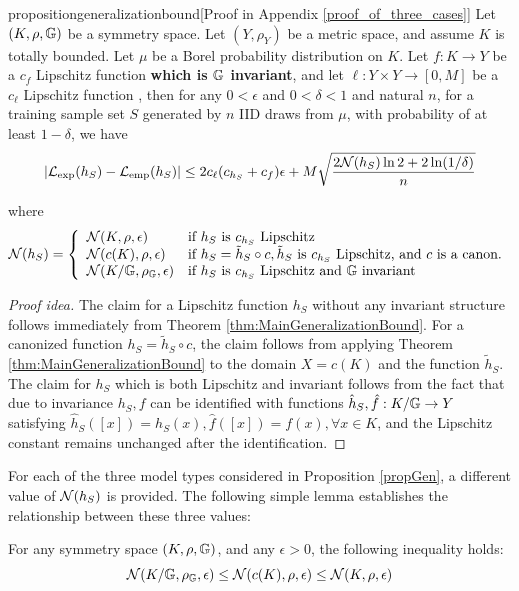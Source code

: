 \begin{restatable}{proposition}{generalizationbound}[Proof  in Appendix \ref{proof_of_three_cases}]
\label{propGen}
Let $(K,\rho,\mathbb{G})$ be a symmetry space. Let $(Y,\rho_Y) $ be a metric space, and assume $K$ is totally bounded. Let $\mu$ be a Borel probability distribution on $K$. Let $f:K\to Y $ be a $c_f$  Lipschitz function \textbf{which is $\mathbb{G} $ invariant}, and let $\ell:Y\times Y \to [0,M] $ be a $c_\ell $ Lipschitz function , then for any $0<\epsilon$ and $0<\delta<1$ and natural $n$, for a training sample set $S$ generated by $n$ IID draws from $\mu$,  with probability of at least $ 1-\delta$, we have
$$|\mathcal{L}_{\mathrm{exp}}(h_S) - \mathcal{L}_{\mathrm{emp}}(h_S)| \le 2c_\ell (c_{h_S}+c_f)\epsilon+M \sqrt{\frac{2\mathcal{N}(h_S) \ln 2 + 2 \ln(1/\delta)}{n}}$$

where
\begin{equation}\label{eq:differentN}
\mathcal{N}(h_S)=\left\{ \begin{array}{lll} \mathcal{N}(K,\rho,\epsilon) & \mbox{if } h_S \text{ is } c_{h_S} \text{ Lipschitz } \\ \mathcal{N}(c(K),\rho,\epsilon) & \mbox{if } h_S=\tilde{h}_S\circ c, \tilde{h}_S \text { is } c_{h_S} \text{ Lipschitz, and }  c \text{ is a canon.} \\ \mathcal{N}(K/\mathbb{G},\rho_{\mathbb{G}},\epsilon) & \mbox{if } h_S \text{ is } c_{h_S} \text{ Lipschitz and  } \mathbb{G} \text{ invariant } \end{array} \right.
\end{equation}
\end{restatable}

\begin{proof}[Proof idea]
The claim for a Lipschitz function $h_S$ without any invariant structure follows immediately from Theorem \ref{thm:MainGeneralizationBound}. For a canonized function  $h_S=\tilde h_{S}\circ c$, the claim follows from applying Theorem \ref{thm:MainGeneralizationBound} to the domain $X=c(K)$ and  the function $\tilde h_{S}$.
The claim for $h_S$ which is both Lipschitz and invariant follows from the fact that due to invariance $h_S, f$ can be identified with functions $\hat h_S, \hat f : K/\mathbb{G} \to Y $ satisfying $\hat h_S([x])=h_S(x), \hat f([x])=f(x), \forall x\in K $, and the Lipschitz constant remains unchanged after the identification.
\end{proof}


For each of the three model types considered in Proposition \ref{propGen}, a different value of $\mathcal{N}(h_S)$ is provided. The following simple lemma establishes the relationship between these three values:
\begin{proposition}
\label{prop:covering_bounds}
    For any symmetry space $(K,\rho,\mathbb{G})$, and any $\epsilon>0$,  the following inequality holds:
    \begin{equation}
        \label{eq:coveringIneq}
        \mathcal{N}(K/\mathbb{G},\rho_{\mathbb{G}},\epsilon)\leq \mathcal{N}(c(K),\rho,\epsilon)\leq \mathcal{N}(K,\rho,\epsilon)
    \end{equation}
\end{proposition}

